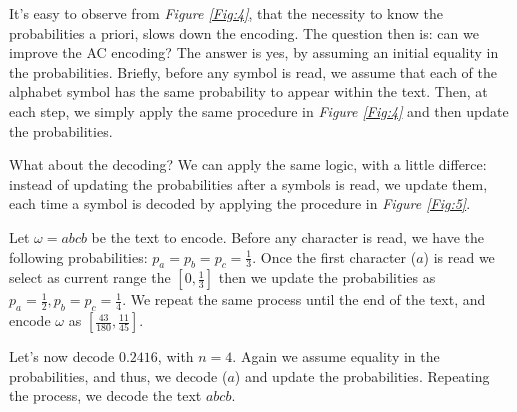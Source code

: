 \documentclass{subfiles}
\begin{document}
    It's easy to observe from \emph{Figure \ref{Fig:4}}, 
    that the necessity to know the probabilities a priori,
    slows down the encoding. 
    The question then is: can we improve the AC encoding? 
    The answer is yes, by assuming an initial equality in the probabilities.
    Briefly, before any symbol is read, 
    we assume that each of the alphabet symbol has the same probability to appear within the text.
    Then, at each step, we simply apply the same procedure in \emph{Figure \ref{Fig:4}}
    and then update the probabilities.

    What about the decoding? We can apply the same logic, with a little differce:
    instead of updating the probabilities after a symbols is read, we update them,
    each time a symbol is decoded by applying the procedure in \emph{Figure \ref{Fig:5}}.

    \begin{example*}
        Let \(\omega = abcb\) be the text to encode. 
        Before any character is read, we have the following probabilities: 
        \(p_{a} = p_{b} = p_{c} = \tfrac{1}{3}\).
        Once the first character (\(a\)) is read we select as current range 
        the \([0, \tfrac{1}{3}]\) then we update the probabilities as 
        \(p_{a} = \tfrac{1}{2}, p_{b} = p_{c} = \tfrac{1}{4}\).
        We repeat the same process until the end of the text,
            and encode \(\omega\) as \([\tfrac{43}{180}, \tfrac{11}{45}]\).
        

        Let's now decode \(0.2416\), with \(n = 4\).
        Again we assume equality in the probabilities, 
            and thus, we decode (\(a\)) and update the probabilities.
            Repeating the process, we decode the text \(abcb\).
        
    \end{example*}
    \clearpage
\end{document}
